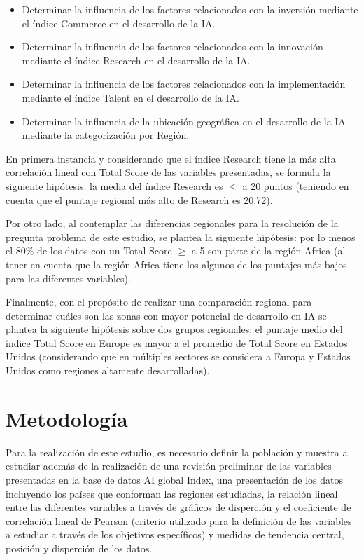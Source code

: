 \documentclass[
]{article}
\begin{document}
\begin{multicols}{2}
\begin{itemize}
\item Determinar la influencia de los factores relacionados con la inversión mediante el índice Commerce en el desarrollo de la IA.
\item Determinar la influencia de los factores relacionados con la innovación mediante el índice Research en el desarrollo de la IA.
\item Determinar la influencia de los factores relacionados con la implementación mediante el índice Talent en el desarrollo de la IA.
\item Determinar la influencia de la ubicación geográfica en el desarrollo de la IA mediante la categorización por Región.
\end{itemize}

En primera instancia y considerando que el índice Research tiene la más alta correlación lineal con Total Score de las variables presentadas, se formula la siguiente hipótesis: la media del índice Research es $≤$ a 20 puntos (teniendo en cuenta que el puntaje regional más alto de Research es 20.72).

Por otro lado, al contemplar las diferencias regionales para la resolución de la pregunta problema de este estudio, se plantea la siguiente hipótesis: por lo menos el 80\% de los datos con un Total Score $≥$ a 5 son parte de la región Africa (al tener en cuenta que la región Africa tiene los algunos de los puntajes más bajos para las diferentes variables).

Finalmente, con el propósito de realizar una comparación regional para determinar cuáles son las zonas con mayor potencial de desarrollo en IA se plantea la siguiente hipótesis sobre dos grupos regionales: el puntaje medio del índice Total Score en Europe es mayor a el promedio de Total Score en Estados Unidos (considerando que en múltiples sectores se considera a Europa y Estados Unidos como regiones altamente desarrolladas).




\section{Metodología}

Para la realización de este estudio, es necesario definir la población y muestra a estudiar además de la realización de una revisión preliminar de las variables presentadas en la base de datos AI global Index, una presentación de los datos incluyendo los países que conforman las regiones estudiadas, la relación lineal entre las diferentes variables a través de gráficos de disperción y el coeficiente de correlación lineal de Pearson (criterio utilizado para la definición de las variables a estudiar a través de los objetivos específicos) y medidas de tendencia central, posición y disperción de los datos.


\end{multicols}
\end{document}

